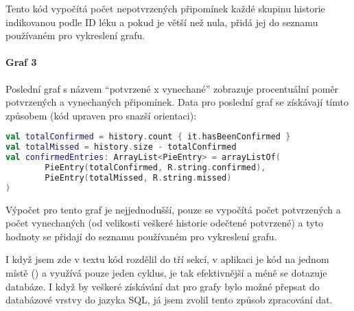 \documentclass[../TakeYourPill.tex]{subfiles}
\begin{document}
Tento kód vypočítá počet nepotvrzených připomínek každé skupinu historie indikovanou podle ID léku a pokud je větší než nula, přidá jej do seznamu používaném pro vykreslení grafu.


\paragraph{Graf 3} Poslední graf s názvem \enquote{potvrzené x vynechané} zobrazuje procentuální poměr potvrzených a vynechaných připomínek. Data pro poslední graf se získávají tímto způsobem (kód upraven pro snazší orientaci):

\begin{lstlisting}[language=Kotlin]
val totalConfirmed = history.count { it.hasBeenConfirmed }
val totalMissed = history.size - totalConfirmed
val confirmedEntries: ArrayList<PieEntry> = arrayListOf(
        PieEntry(totalConfirmed, R.string.confirmed),
        PieEntry(totalMissed, R.string.missed)
)
\end{lstlisting}

Výpočet pro tento graf je nejjednodušší, pouze se vypočítá počet potvrzených a počet vynechaných (od velikosti veškeré historie odečtené potvrzené) a tyto hodnoty se přidají do seznamu používaném pro vykreslení grafu.

I když jsem zde v textu kód rozdělil do tří sekcí, v aplikaci je kód na jednom místě () a využívá pouze jeden cyklus, je tak efektivnější a méně se dotazuje databáze. I když by veškeré získávání dat pro grafy bylo možné přepsat do databázové vrstvy do jazyka SQL, já jsem zvolil tento způsob zpracování dat.
\end{document}

